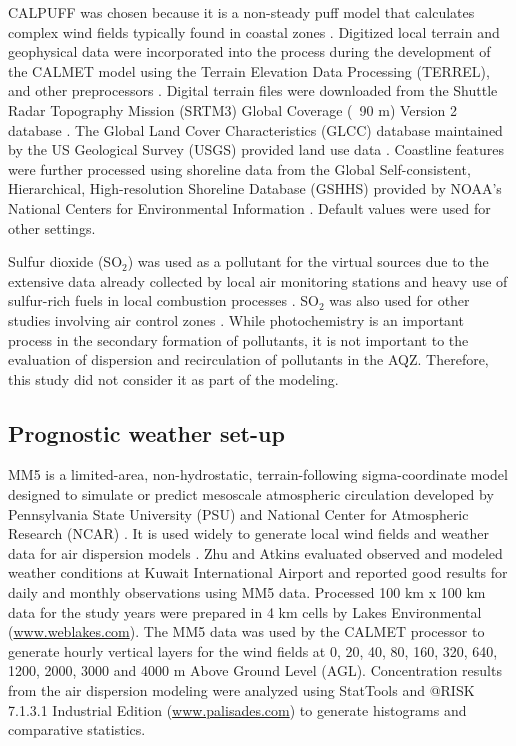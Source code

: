 CALPUFF was chosen because it is a non-steady puff model that calculates complex wind fields typically found in coastal zones \citep{Ghannam2013a, Indumati2009, USEPA2014, Weiss2014}.  Digitized local terrain and geophysical data were incorporated into the process during the development of the CALMET model using the Terrain Elevation Data Processing (TERREL), and other preprocessors \citep{Scire2000}.  Digital terrain files were downloaded from the Shuttle Radar Topography Mission (SRTM3) Global Coverage (~90 m) Version 2 database \citep{USGS2000}.  The Global Land Cover Characteristics (GLCC) database maintained by the US Geological Survey (USGS) provided land use data \citep{USGS2008}.  Coastline features were further processed using shoreline data from the Global Self-consistent, Hierarchical, High-resolution Shoreline Database (GSHHS) provided by NOAA's National Centers for Environmental Information \citep{NOAA2015}.  Default values were used for other settings.

Sulfur dioxide (SO$_{2}$) was used as a pollutant for the virtual sources due to the extensive data already collected by local air monitoring stations and heavy use of sulfur-rich fuels in local combustion processes \citep{Al-Awadhi2014, Al-Rashidi2005}.  SO$_{2}$ was also used for other studies involving air control zones \citep{Hao2000, Henschel2013, Pereira2007}.  While photochemistry is an important process in the secondary formation of pollutants, it is not important to the evaluation of dispersion and recirculation of pollutants in the AQZ.  Therefore, this study did not consider it as part of the modeling. 

\subsection{Prognostic weather set-up}

MM5 is a limited-area, non-hydrostatic, terrain-following sigma-coordinate model designed to simulate or predict mesoscale atmospheric circulation developed by Pennsylvania State University (PSU) and National Center for Atmospheric Research (NCAR) \citep{Grell1994}.  It is used widely to generate local wind fields and weather data for air dispersion models \citep{Ghannam2013a, Lee2009, Tsai2011, Zhu2004}.  Zhu and Atkins evaluated observed and modeled weather conditions at Kuwait International Airport and reported good results for daily and monthly observations using MM5 data. Processed 100 km x 100 km data for the study years were prepared in 4 km cells by Lakes Environmental (\url{www.weblakes.com}). The MM5 data was used by the CALMET processor to generate hourly vertical layers for the wind fields at 0, 20, 40, 80, 160, 320, 640, 1200, 2000, 3000 and 4000 m Above Ground Level (AGL). Concentration results from the air dispersion modeling were analyzed using StatTools and @RISK 7.1.3.1 Industrial Edition (\url{www.palisades.com}) to generate histograms and comparative statistics. 

